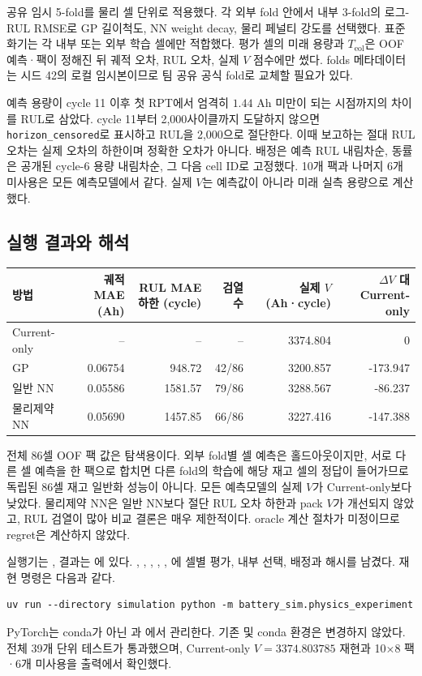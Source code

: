 공유 임시 5-fold를 물리 셀 단위로 적용했다. 각 외부 fold 안에서 내부 3-fold의 로그-RUL RMSE로 GP 길이척도, NN weight decay, 물리 페널티 강도를 선택했다. 표준화기는 각 내부 또는 외부 학습 셀에만 적합했다. 평가 셀의 미래 용량과 $T_{\mathrm{eol}}$은 OOF 예측·팩이 정해진 뒤 궤적 오차, RUL 오차, 실제 $V$ 점수에만 썼다. folds 메타데이터는 시드 42의 로컬 임시본이므로 팀 공유 공식 fold로 교체할 필요가 있다.

예측 용량이 cycle 11 이후 첫 RPT에서 엄격히 $1.44$ Ah 미만이 되는 시점까지의 차이를 RUL로 삼았다. cycle 11부터 2,000사이클까지 도달하지 않으면 \texttt{horizon\_censored}로 표시하고 RUL을 2,000으로 절단한다. 이때 보고하는 절대 RUL 오차는 실제 오차의 하한이며 정확한 오차가 아니다. 배정은 예측 RUL 내림차순, 동률은 공개된 cycle-6 용량 내림차순, 그 다음 cell ID로 고정했다. 10개 팩과 나머지 6개 미사용은 모든 예측모델에서 같다. 실제 $V$는 예측값이 아니라 미래 실측 용량으로 계산했다.

\subsection*{실행 결과와 해석}
\begin{center}
\begin{tabular}{lrrrrr}
\toprule
방법 & 궤적 MAE (Ah) & RUL MAE 하한 (cycle) & 검열 수 & 실제 $V$ (Ah·cycle) & $\Delta V$ 대 Current-only \\
\midrule
Current-only & -- & -- & -- & 3374.804 & 0 \\
GP & 0.06754 & 948.72 & 42/86 & 3200.857 & -173.947 \\
일반 NN & 0.05586 & 1581.57 & 79/86 & 3288.567 & -86.237 \\
물리제약 NN & 0.05690 & 1457.85 & 66/86 & 3227.416 & -147.388 \\
\bottomrule
\end{tabular}
\end{center}

전체 86셀 OOF 팩 값은 탐색용이다. 외부 fold별 셀 예측은 홀드아웃이지만, 서로 다른 셀 예측을 한 팩으로 합치면 다른 fold의 학습에 해당 재고 셀의 정답이 들어가므로 독립된 86셀 재고 일반화 성능이 아니다. 모든 예측모델의 실제 $V$가 Current-only보다 낮았다. 물리제약 NN은 일반 NN보다 절단 RUL 오차 하한과 pack $V$가 개선되지 않았고, RUL 검열이 많아 비교 결론은 매우 제한적이다. oracle 계산 절차가 미정이므로 regret은 계산하지 않았다.

실행기는 , 결과는 에 있다. , , , , , 에 셀별 평가, 내부 선택, 배정과 해시를 남겼다. 재현 명령은 다음과 같다.
\begin{Verbatim}[fontsize=\small]
uv run --directory simulation python -m battery_sim.physics_experiment
\end{Verbatim}
PyTorch는 conda가 아닌 과 에서 관리한다. 기존  및 conda 환경은 변경하지 않았다. 전체 39개 단위 테스트가 통과했으며, Current-only $V=3374.803785$ 재현과 10×8 팩·6개 미사용을 출력에서 확인했다.

